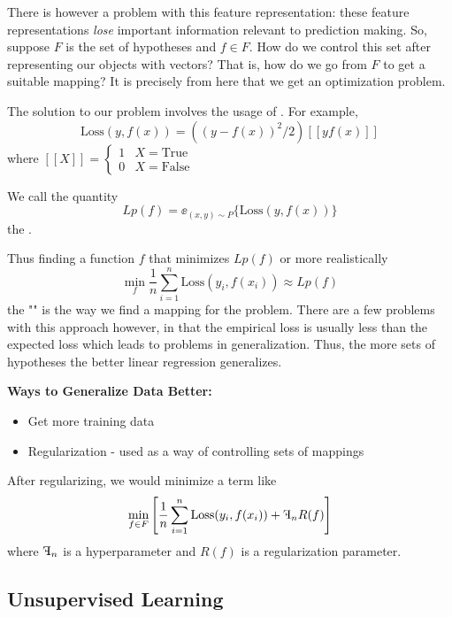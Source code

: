 \documentclass[11pt]{scrartcl}
\begin{document}
There is however a problem with this feature representation: these feature representations \textit{lose} important information relevant to prediction making. So, suppose $F$ is the set of hypotheses and $f \in F$. How do we control this set after representing our objects with vectors? That is, how do we go from $F$ to get a suitable mapping? It is precisely from here that we get an optimization problem. 


The solution to our problem involves the usage of . For example, 
$$\text{Loss}(y,f(x))= ((y-f(x))^2/2)[[yf(x)]] $$
where $[[X]]=\begin{cases} 1 & X=\text{True} \\ 0 & X = \text{False} \end{cases}$
\newpage
\begin{defn}
We call the quantity $$Lp(f)=\ee_{(x,y) \sim P}\{\text{Loss}(y,f(x))\}$$
the . 
\end{defn}
Thus finding a function $f$ that minimizes $Lp(f)$ or more realistically 
$$\min_{f}\frac{1}{n}\sum_{i=1}^{n} \text{Loss}(y_i,f(x_i)) \approx Lp(f)$$
the "" is the way we find a mapping for the problem. There are a few problems with this approach however, in that the empirical loss is usually less than the expected loss which leads to problems in generalization. Thus, the more sets of hypotheses the better linear regression generalizes. 

\textbf{Ways to Generalize Data Better:}
\begin{itemize}
    \item Get more training data
    \item Regularization - used as a way of controlling sets of mappings
\end{itemize}
After regularizing, we would minimize a term like $$\min_{f \in F} \left[\frac{1}{n}\sum_{i=1}^{n}\text{Loss}(y_i,f(x_i))+\reflectbox{F}_nR(f)\right]$$
where $\reflectbox{F}_n$ is a hyperparameter and $R(f)$ is a regularization parameter. 

\subsection{Unsupervised Learning}
\end{document}
